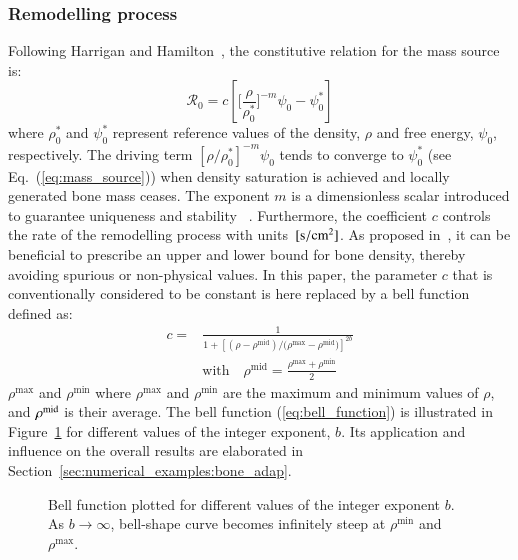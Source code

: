 \documentclass[11pt]{acmeArticle}
\numberwithin{equation}{section}
\begin{document}
\subsubsection{Remodelling process}

\label{sec:constitutive_eq}

Following Harrigan and Hamilton~\citep{Harrigan1993}, the constitutive
relation for the mass source is:
\begin{equation}
\mathcal{R}_{0}=c\left[\Biggl[\frac{\rho}{\rho_{0}^{\ast}}\Biggr]^{-m}\psi_{0}
-\psi_{0}^{\ast}\right]
\label{eq:mass_source}
\end{equation}
where $\rho_0^\ast$ and $\psi_{0}^\ast$ represent reference values of the
density, $\rho$ and free energy, $\psi_0$, respectively. The driving term
$\left[ \rho / \rho_0^\ast \right]^{-m}\psi_0$ tends to converge to
$\psi_{0}^\ast$ (see Eq.~(\ref{eq:mass_source})) when density saturation is
achieved and locally generated bone mass ceases. The exponent $m$ is a
dimensionless scalar introduced to guarantee uniqueness and
stability~\citep{Harrigan1993} . Furthermore, the coefficient $c$ controls
the rate of the remodelling process with units~$[\rm{s/cm^2}]$. As proposed
in~\citep{Waffenschmidt2012}, it can be beneficial to prescribe an upper and
lower bound for bone density, thereby avoiding spurious or non-physical
values. In this paper, the parameter $c$ that is conventionally considered 
to be constant is here replaced by a bell function
defined as:
\begin{equation}
\begin{aligned}
c = & \frac{1}{1 + \left[  (\rho - \rho^{\mathrm{mid}}) / 
(\rho{^\mathrm{max}} - \rho{^\mathrm{mid})} \right]^{2 b}}\\
& \mathrm{with} \quad \rho^{\mathrm{mid}} = 
\frac{\rho{^\mathrm{max}} + \rho{^\mathrm{min}}}{2}
\end{aligned}
\label{eq:bell_function}
\end{equation}
$\rho^\mathrm{max}$ and $ \rho{^\mathrm{min}}$ where $\rho^\mathrm{max}$
and $\rho^\mathrm{min}$ are the maximum and minimum values of $\rho$, and
$\rho^{\rm {mid}}$ is their average. The bell function
(\ref{eq:bell_function}) is illustrated in Figure~\ref{fig:bell_func} for
different values of the integer exponent, $b$. Its application and influence
on the overall results are elaborated in
Section~\ref{sec:numerical_examples:bone_adap}.
\begin{figure}[!htb]
	\centering
		
		\caption{Bell function plotted for different values of the integer exponent $b$. 
		As $b \rightarrow \infty$, bell-shape curve becomes infinitely steep at 
		$\rho{^\mathrm{min}}$ and $ \rho{^\mathrm{max}}$.}
		\label{fig:bell_func}
\end{figure}
\end{document}
